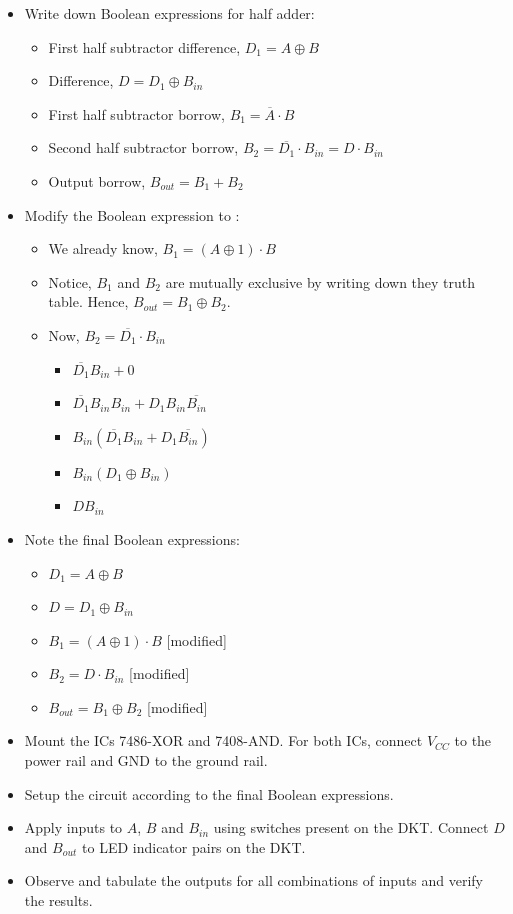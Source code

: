 \documentclass[11pt, a4paper]{article}
\begin{document}
\begin{itemize}
    \item Write down Boolean expressions for half adder:
    \begin{itemize}[label=$\circ$]
        \item First half subtractor difference, $D_1 = A \oplus B$
        \item Difference, $D = D_1 \oplus B_{in}$
        \item First half subtractor borrow, $B_1 = \overline{A} \cdot B$
        \item Second half subtractor borrow, $B_2 = \overline{D_1} \cdot B_{in} = D \cdot B_{in}$
        \item Output borrow, $B_{out} = B_1 + B_2$
    \end{itemize}
    \item Modify the Boolean expression to :
    \begin{itemize}[label=$\circ$]
        \item We already know, $B_1 = (A \oplus 1) \cdot B$
        \item Notice, $B_1$ and $B_2$ are mutually exclusive by writing down they truth table. Hence, $B_{out} = B_1 \oplus B_2$.
        \item Now, $B_2 = \overline{D_1} \cdot B_{in}$
        \begin{itemize}[label={$=$}]
            \item $\overline{D_1} B_{in} + 0$
            \item $\overline{D_1} B_{in} B_{in} + D_1 B_{in} \overline{B_{in}}$
            \item $B_{in} (\overline{D_1} B_{in} + D_1 \overline{B_{in}})$
            \item $B_{in} (D_1 \oplus B_{in})$
            \item $D B_{in}$
        \end{itemize}
    \end{itemize}
    \item Note the final Boolean expressions:
    \begin{itemize}[label=$\circ$]
        \item $D_1 = A \oplus B$
        \item $D = D_1 \oplus B_{in}$
        \item $B_1 = (A \oplus 1) \cdot B$ \hfill [modified]
        \item $B_2 = D \cdot B_{in}$ \hfill [modified]
        \item $B_{out} = B_1 \oplus B_2$ \hfill [modified]
    \end{itemize}
    \item Mount the ICs 7486-XOR and 7408-AND. For both ICs, connect $V_{CC}$ to the power rail and $\text{GND}$ to the ground rail.
    \item Setup the circuit according to the final Boolean expressions.
    \item Apply inputs to $A$, $B$ and $B_{in}$ using switches present on the DKT. Connect $D$ and $B_{out}$ to LED indicator pairs on the DKT.
    \item Observe and tabulate the outputs for all combinations of inputs and verify the results.
\end{itemize}
\end{document}
